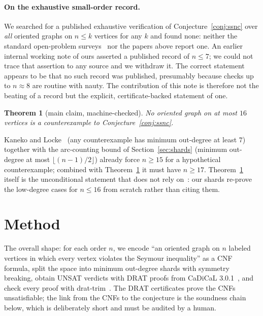\documentclass[11pt]{article}
\newtheorem{theorem}{Theorem}
\begin{document}
\paragraph{On the exhaustive small-order record.}
We searched for a published exhaustive verification of
Conjecture~\ref{conj:ssnc} over \emph{all} oriented graphs on $n \le k$
vertices for any $k$ and found none: neither the standard open-problem
surveys~\cite{MoharPage,WestPage} nor the papers above report one. An
earlier internal working note of ours asserted a published record of
$n \le 7$; we could not trace that assertion to any source and we withdraw
it. The correct statement appears to be that no such record was published,
presumably because checks up to $n \approx 8$ are routine with nauty. The
contribution of this note is therefore not the beating of a record but the
explicit, certificate-backed statement of one.

\begin{theorem}[main claim, machine-checked]\label{thm:main}
No oriented graph on at most $16$ vertices is a counterexample to
Conjecture~\ref{conj:ssnc}.
\end{theorem}

Kaneko and Locke~\cite{KanekoLocke01} (any counterexample has minimum
out-degree at least $7$) together with the arc-counting bound of
Section~\ref{sec:shards} (minimum out-degree at most
$\lfloor (n-1)/2 \rfloor$) already force $n \ge 15$ for a hypothetical
counterexample; combined with Theorem~\ref{thm:main} it must have
$n \ge 17$. Theorem~\ref{thm:main} itself is the unconditional statement
that does not rely on~\cite{KanekoLocke01}: our shards re-prove the
low-degree cases for $n \le 16$ from scratch rather than citing them.

\section{Method}\label{sec:method}

The overall shape: for each order $n$, we encode ``an oriented graph on $n$
labeled vertices in which every vertex violates the Seymour inequality''
as a CNF formula, split the space into minimum out-degree shards with
symmetry breaking, obtain UNSAT verdicts with DRAT proofs from CaDiCaL
3.0.1~\cite{Cadical}, and check every proof with
drat-trim~\cite{DratTrim}. The DRAT certificates prove the CNFs
unsatisfiable; the link from the CNFs to the conjecture is the soundness
chain below, which is deliberately short and must be audited by a human.
\end{document}
